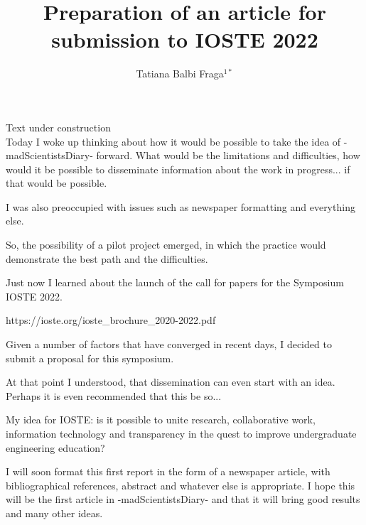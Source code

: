 \documentclass{book}
\title{Preparation of an article for submission to IOSTE 2022}
\author{Tatiana Balbi Fraga$^{1*}$}
\begin{document}
Text under construction \\

Today I woke up thinking about how it would be possible to take the idea of -madScientistsDiary- forward. What would be the limitations and difficulties, how would it be possible to disseminate information about the work in progress... if that would be possible.

I was also preoccupied with issues such as newspaper formatting and everything else.

So, the possibility of a pilot project emerged, in which the practice would demonstrate the best path and the difficulties.

Just now I learned about the launch of the call for papers for the Symposium IOSTE 2022.

https://ioste.org/ioste\_brochure\_2020-2022.pdf

Given a number of factors that have converged in recent days, I decided to submit a proposal for this symposium.

At that point I understood, that dissemination can even start with an idea. Perhaps it is even recommended that this be so...

My idea for IOSTE: is it possible to unite research, collaborative work, information technology and transparency in the quest to improve undergraduate engineering education?

I will soon format this first report in the form of a newspaper article, with bibliographical references, abstract and whatever else is appropriate. I hope this will be the first article in -madScientistsDiary- and that it will bring good results and many other ideas.
\end{document}
